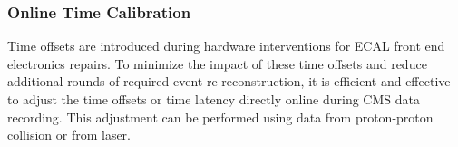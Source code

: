 \subsubsection{Online Time Calibration}
Time offsets are introduced during hardware interventions for ECAL front end electronics repairs. 
To minimize the impact of these time offsets and reduce additional rounds of required event re-reconstruction, it is efficient and effective to adjust the time offsets or time latency directly online during CMS data recording. This adjustment can be performed using data from proton-proton collision or from laser. 
